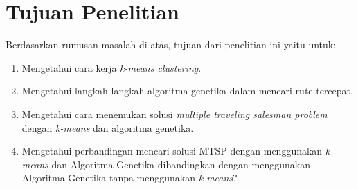 \section{Tujuan Penelitian}

Berdasarkan rumusan masalah di atas, tujuan dari penelitian ini yaitu untuk:
\begin{enumerate}
	\item Mengetahui cara kerja \textit{k-means clustering}.
	\item Mengetahui langkah-langkah algoritma genetika dalam mencari rute tercepat.
	\item Mengetahui cara menemukan solusi \textit{multiple traveling salesman problem} dengan \textit{k-means} dan algoritma genetika.
	\item Mengetahui perbandingan mencari solusi MTSP dengan menggunakan \textit{k-means} dan Algoritma Genetika dibandingkan dengan menggunakan Algoritma Genetika tanpa menggunakan \textit{k-means}?
\end{enumerate}
